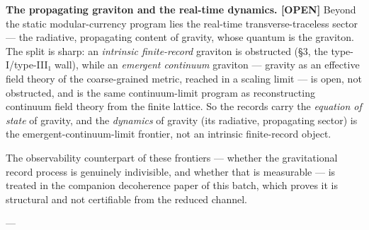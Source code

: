 \documentclass[11pt]{article}
\begin{document}
\textbf{The propagating graviton and the real-time dynamics. [OPEN]} Beyond the static modular-currency program lies the real-time transverse-traceless sector — the radiative, propagating content of gravity, whose quantum is the graviton. The split is sharp: an \emph{intrinsic finite-record} graviton is obstructed (§3, the type-I/type-III₁ wall), while an \emph{emergent continuum} graviton — gravity as an effective field theory of the coarse-grained metric, reached in a scaling limit — is open, not obstructed, and is the same continuum-limit program as reconstructing continuum field theory from the finite lattice. So the records carry the \emph{equation of state} of gravity, and the \emph{dynamics} of gravity (its radiative, propagating sector) is the emergent-continuum-limit frontier, not an intrinsic finite-record object.

The observability counterpart of these frontiers — whether the gravitational record process is genuinely indivisible, and whether that is measurable — is treated in the companion decoherence paper of this batch, which proves it is structural and not certifiable from the reduced channel.

---
\end{document}

